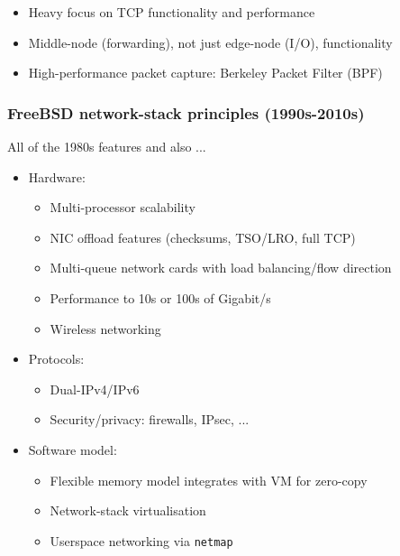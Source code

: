 \begin{frame}
\begin{itemize}
\begin{itemize}
      \item Heavy focus on TCP functionality and performance

      \pause

      \item Middle-node (forwarding), not just edge-node (I/O), functionality 

      \pause

      \item High-performance packet capture: Berkeley Packet Filter (BPF)
    \end{itemize}
  \end{itemize}
\end{frame}

\begin{frame}
  \frametitle{FreeBSD network-stack principles (1990s-2010s)}

  All of the 1980s features and also ...

  \medskip
  \pause

  \begin{itemize}
    \item Hardware:
    \begin{itemize}
      \item Multi-processor scalability
      \item NIC offload features (checksums, TSO/LRO, full TCP)
      \item Multi-queue network cards with load balancing/flow direction
      \item Performance to 10s or 100s of Gigabit/s
      \item Wireless networking
    \end{itemize}

    \medskip
    \pause

    \item Protocols:
    \begin{itemize}
      \item Dual-IPv4/IPv6
      \item Security/privacy: firewalls, IPsec, ...
    \end{itemize}

    \medskip
    \pause

    \item Software model:
    \begin{itemize}
      \item Flexible memory model integrates with VM for zero-copy
      \item Network-stack virtualisation
      \item Userspace networking via \texttt{netmap}
    \end{itemize}
  \end{itemize}
\end{frame}

